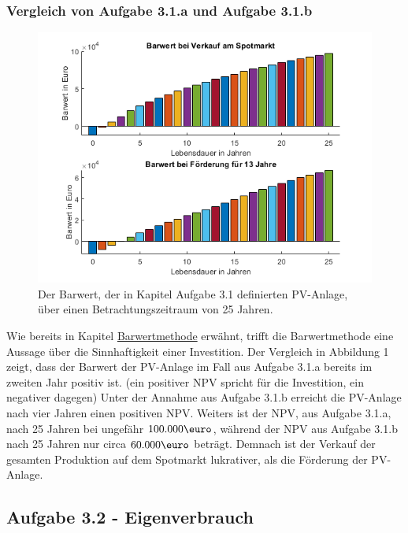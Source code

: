 \documentclass[a4paper,12pt]{article}
\begin{document}
	\subsubsection{Vergleich von Aufgabe 3.1.a und Aufgabe 3.1.b}
	\begin{figure}[H]
		\centering
		\includegraphics[width=12cm]{img/results/BarwertVergleich}
		\caption{Der Barwert, der in Kapitel Aufgabe 3.1 definierten PV-Anlage, über einen Betrachtungszeitraum von 25 Jahren.}
	\end{figure}
	Wie bereits in Kapitel \hyperref[sec:BerechnungenBarwertmethode]{Barwertmethode} erwähnt, trifft die Barwertmethode eine Aussage über die Sinnhaftigkeit einer Investition.\newline
	Der Vergleich in Abbildung 1 zeigt, dass der Barwert der PV-Anlage im Fall aus Aufgabe 3.1.a bereits im zweiten Jahr positiv ist. (ein positiver NPV spricht für die Investition, ein negativer dagegen)\newline
	Unter der Annahme aus Aufgabe 3.1.b erreicht die PV-Anlage nach vier Jahren einen positiven NPV. Weiters ist der NPV, aus Aufgabe 3.1.a, nach 25 Jahren bei ungefähr $100.000\mbox{\euro}$, während der NPV aus Aufgabe 3.1.b nach 25 Jahren nur circa $60.000\mbox{\euro}$ beträgt.\newline
	Demnach ist der Verkauf der gesamten Produktion auf dem Spotmarkt lukrativer, als die Förderung der PV-Anlage.
	\subsection{Aufgabe 3.2 - Eigenverbrauch}
\end{document}
